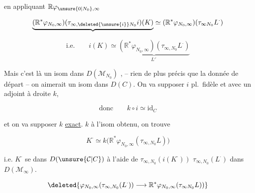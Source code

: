 en appliquant $\mathbb R\varphi_{\unsure{0|N_0},\infty}$

\[
\underbrace{(\mathbb R^*\varphi_{N_0,\infty})(\tau_{\infty,\deleted{\unsure{i}}N_0}i)(K)}
\simeq(\mathbb R^{*}\varphi_{N_0,\infty})(\tau_{\infty N_0}L^\cdot)
\]

\[
\text{i.e.}\qquad i(K)\simeq
\underbrace{(\mathbb R^*\varphi_{N_0,\infty})(\tau_{\infty,N_0}L^\cdot)}_{L'^\cdot}
\]


Mais c'est là un isom dans $D(\mathcal M_{N_0})$ , -- rien de plus précis que la donnée de départ -- on aimerait un isom dans $D(C)$. On va supposer $i$ pl.\ fidèle et avec un adjoint à droite $k$,

\[
\text{donc}\qquad k\circ i\simeq\mathrm{id}_C
\]

et on va supposer $k$ \uline{exact}.  $k$ à l'isom obtenu, on trouve

\[
K^\cdot\simeq k\bigl(\mathbb R^*\varphi_{N_0,\infty}(\tau_{\infty,N_0}L)\bigr)
\]


i.e. $K^\cdot$ se  dans $D(\unsure{\mathcal C|C})$ à l'aide de $\tau_{\infty,N_0}(i(K^\cdot))$  $\tau_{\infty,N_0}(L^\cdot)$ dans $D(\mathcal M_\infty)$.


\[
\deleted{\varphi_{N_0,\infty}(\tau_{\infty,N_0}(L^\cdot))\longrightarrow\mathbb R^*\varphi_{N_0,\infty}(\tau_{\infty N_0}L))}
\]




